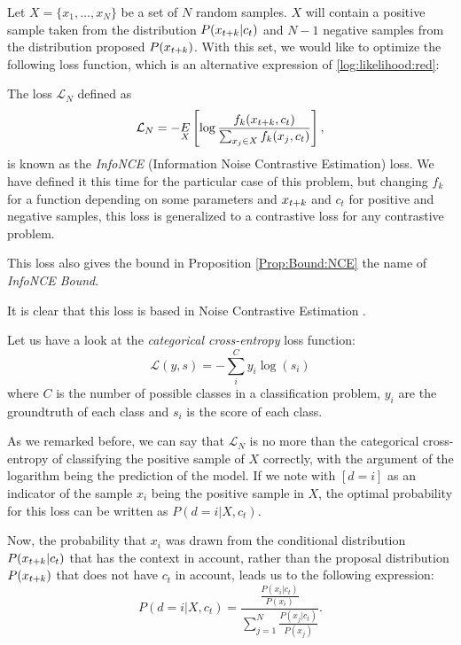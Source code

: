 Let $X = \{x_1,\dots,x_N\}$ be a set of $N$ random samples. $X$ will contain a positive sample taken from the distribution $P( x_{t+k} |c_t)$ and $N-1$ negative
samples from the distribution proposed $P(x_{t+k})$. With this set, we would like to optimize the following loss function, which is an alternative expression of \eqref{log:likelihood:red}:
\begin{ndef}
The loss $\mathcal L_N$ defined as
\begin{equation}\label{NCE:loss}
\mathcal L_N = - \underset{X}{E} \left[\log \frac{f_k(x_{t+k},c_t)}{\sum_{x_j \in X} f_k(x_j,c_t)}\right],
\end{equation}
is known as the \emph{InfoNCE} (Information Noise Contrastive Estimation) loss. We have defined it this time for the particular case of this problem, but changing $f_k$ for a function depending on some parameters and $x_{t+k}$ and $c_t$ for positive and negative samples, this loss is generalized to a contrastive loss for any contrastive problem.

This loss also gives the bound in Proposition \ref{Prop:Bound:NCE} the name of \emph{InfoNCE Bound}.

\end{ndef}
It is clear that this loss is based in Noise Contrastive Estimation \citep{gutmann_noise-contrastive_nodate}.

Let us have a look at the \emph{categorical cross-entropy} loss function:
\[
    \mathcal L(y,s) = -\sum_i^C y_i \log(s_i)    
\]
where $C$ is the number of possible classes in a classification problem, $y_i$ are the groundtruth of each class and $s_i$ is the score of each class.

As we remarked before, we can say that $\mathcal L_N$ is no more than the categorical cross-entropy of classifying the positive sample of $X$ correctly, with the argument of the logarithm being the prediction
of the model. If we note with $[d = i]$ as an indicator of the sample $x_i$ being the positive sample in $X$, the optimal probability for this loss can be written as $P(d = i|X,c_t)$. 

Now, the probability that $x_i$ was drawn from the conditional distribution $P(x_{t+k}|c_t)$ that has the context in account, rather than the proposal distribution $P(x_{t+k})$ that does not have $c_t$ in account, leads us to the following expression:
$$
P(d = i | X , c_t) = \frac{ \frac{P(x_i|c_t)}{P(x_i)}}{\sum_{j=1}^N \frac{P(x_j|c_t)}{P(x_j)}}.
$$

